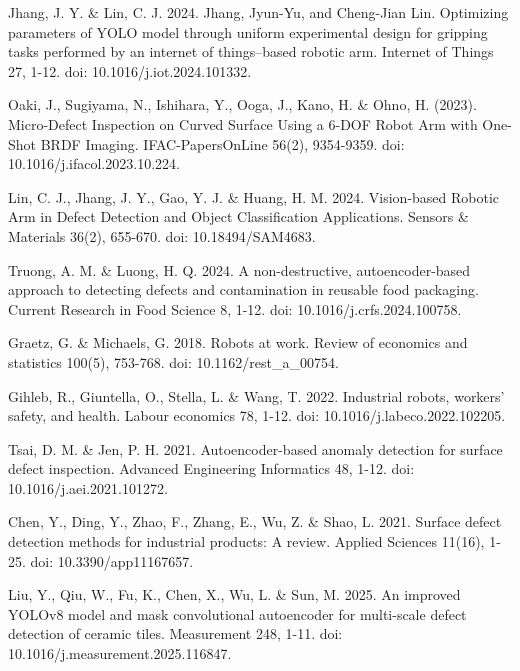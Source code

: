 \begin{thebibliography}{9}

  Jhang, J. Y. \& Lin, C. J. 2024. Jhang, Jyun-Yu, and Cheng-Jian
  Lin. Optimizing parameters of YOLO model through uniform
  experimental design for gripping tasks performed by an internet of
  things–based robotic arm. Internet of Things 27, 1-12. doi:
  10.1016/j.iot.2024.101332.

  Oaki, J., Sugiyama, N., Ishihara, Y., Ooga, J., Kano, H. \& Ohno,
  H. (2023). Micro-Defect Inspection on Curved Surface Using a 6-DOF
  Robot Arm with One-Shot BRDF Imaging. IFAC-PapersOnLine 56(2),
  9354-9359. doi: 10.1016/j.ifacol.2023.10.224.

  Lin, C. J., Jhang, J. Y., Gao, Y. J. \& Huang, H. M. 2024.
  Vision-based Robotic Arm in Defect Detection and Object
  Classification Applications. Sensors \& Materials 36(2), 655-670.
  doi: 10.18494/SAM4683.

  Truong, A. M. \& Luong, H. Q. 2024. A non-destructive,
  autoencoder-based approach to detecting defects and contamination
  in reusable food packaging. Current Research in Food Science 8, 1-12.
  doi: 10.1016/j.crfs.2024.100758.

  Graetz, G. \& Michaels, G. 2018. Robots at work. Review of
  economics and statistics 100(5), 753-768. doi: 10.1162/rest\_a\_00754.

  Gihleb, R., Giuntella, O., Stella, L. \& Wang, T. 2022.
  Industrial robots, workers’ safety, and health. Labour economics
  78, 1-12. doi: 10.1016/j.labeco.2022.102205.

  Tsai, D. M. \& Jen, P. H. 2021. Autoencoder-based anomaly detection
  for surface defect inspection. Advanced Engineering Informatics 48,
  1-12. doi: 10.1016/j.aei.2021.101272.

  Chen, Y., Ding, Y., Zhao, F., Zhang, E., Wu, Z. \& Shao, L. 2021.
  Surface defect detection methods for industrial products: A review.
  Applied Sciences 11(16), 1-25. doi: 10.3390/app11167657.

  Liu, Y., Qiu, W., Fu, K., Chen, X., Wu, L. \& Sun, M. 2025. An
  improved YOLOv8 model and mask convolutional autoencoder for
  multi-scale defect detection of ceramic tiles. Measurement 248,
  1-11. doi: 10.1016/j.measurement.2025.116847.


\end{thebibliography}
